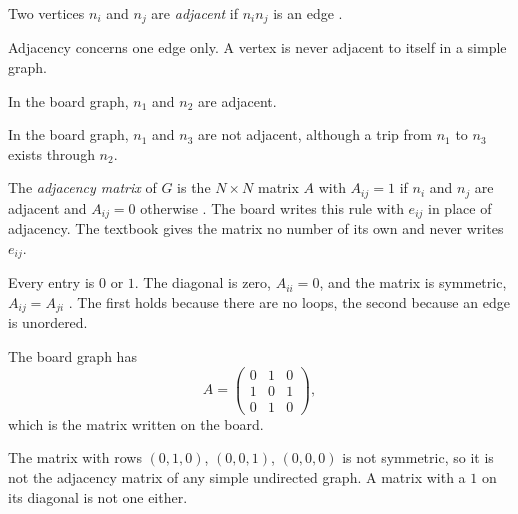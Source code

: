 \begin{definition}\label{def:adjacent}
Two vertices $n_i$ and $n_j$ are \emph{adjacent} if $n_in_j$ is an edge \cite[Def.~1.1.4, p.~11]{petrosyan2015grafneri}.
\end{definition}
\begin{remark}
Adjacency concerns one edge only. A vertex is never adjacent to itself in a simple graph.
\end{remark}
\begin{example}
In the board graph, $n_1$ and $n_2$ are adjacent.
\end{example}
\begin{nonexample}
In the board graph, $n_1$ and $n_3$ are not adjacent, although a trip from $n_1$ to $n_3$ exists through $n_2$.
\end{nonexample}

\begin{definition}\label{def:adjmatrix}
The \emph{adjacency matrix} of $G$ is the $N\times N$ matrix $A$ with $A_{ij}=1$ if $n_i$ and $n_j$ are adjacent and $A_{ij}=0$ otherwise \cite[p.~11]{petrosyan2015grafneri}. The board writes this rule with $e_{ij}$ in place of adjacency. The textbook gives the matrix no number of its own and never writes $e_{ij}$.
\end{definition}
\begin{remark}
Every entry is $0$ or $1$. The diagonal is zero, $A_{ii}=0$, and the matrix is symmetric, $A_{ij}=A_{ji}$ \cite[p.~11]{petrosyan2015grafneri}. The first holds because there are no loops, the second because an edge is unordered.
\end{remark}
\begin{example}\label{ex:boardmatrix}
The board graph has
\[
A=\begin{pmatrix}0&1&0\\1&0&1\\0&1&0\end{pmatrix},
\]
which is the matrix written on the board.
\end{example}
\begin{nonexample}
The matrix with rows $(0,1,0)$, $(0,0,1)$, $(0,0,0)$ is not symmetric, so it is not the adjacency matrix of any simple undirected graph. A matrix with a $1$ on its diagonal is not one either.
\end{nonexample}

